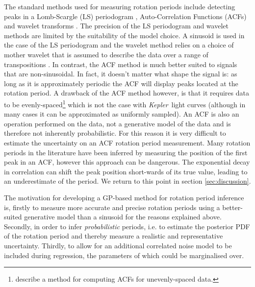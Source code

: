 \documentclass[useAMS, usenatbib, preprint, 12pt]{aastex}
\newcommand{\Kepler}{{\it Kepler}}
\newcommand{\eg}{{\it e.g.}}
\begin{document}
The standard methods used for measuring rotation periods include detecting
peaks in a Lomb-Scargle \citep{Lomb1976, Scargle1982} (LS) periodogram
\citep[e.g.][]{Reinhold2013}, Auto-Correlation Functions (ACFs)
\citep{Mcquillan2013} and wavelet transforms \citep{Garcia2014}.
The precision of the LS periodogram and wavelet methods are limited by the
suitability of the model choice.
A sinusoid is used in the case of the LS periodogram and the wavelet method
relies on a choice of mother wavelet that is assumed to describe the data over
a range of transpositions \citep[see, \eg][]{Carter2010}.
In contrast, the ACF method is much better suited to signals that are
non-sinusoidal.
In fact, it doesn't matter what shape the signal is: as long as it is
approximately periodic the ACF will display peaks located at the rotation
period.
A drawback of the ACF method however, is that it requires data to be
evenly-spaced\footnote{\citet{Edelson1988} describe a method for computing
ACFs for unevenly-spaced data.} which is not the case with \Kepler\ light
curves (although in many cases it can be approximated as uniformly sampled).
An ACF is also an operation performed on the data, not a generative model of
the data and is therefore not inherently probabilistic.
For this reason it is very difficult to estimate the uncertainty on an ACF
rotation period measurement.
Many rotation periods in the literature have been inferred by measuring the
position of the first peak in an ACF, however this approach can be dangerous.
The exponential decay in correlation can shift the peak position short-wards
of its true value, leading to an underestimate of the period.
We return to this point in section \textsection \ref{sec:discussion}.

The motivation for developing a GP-based method for rotation period inference
is, firstly to measure more accurate and precise rotation periods using a
better-suited generative model than a sinusoid for the reasons explained
above.
Secondly, in order to infer {\it probabilistic} periods, i.e. to estimate the
posterior PDF of the rotation period and thereby measure a realistic and
representative uncertainty.
Thirdly, to allow for an additional correlated noise model to be included
during regression, the parameters of which could be marginalised over.
\end{document}
